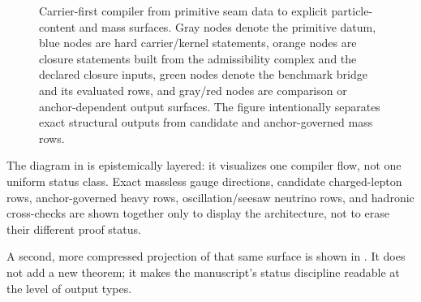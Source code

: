 \begin{figure}[p]
\caption{Carrier-first compiler from primitive seam data to explicit particle-content and mass surfaces. Gray nodes denote the primitive datum, blue nodes are hard carrier/kernel statements, orange nodes are closure statements built from the admissibility complex and the declared closure inputs, green nodes denote the benchmark bridge and its evaluated rows, and gray/red nodes are comparison or anchor-dependent output surfaces. The figure intentionally separates exact structural outputs from candidate and anchor-governed mass rows.}
\label{fig:compiler-to-masses}
\end{figure}

The diagram in  is epistemically layered: it visualizes one compiler flow, not one uniform status class. Exact massless gauge directions, candidate charged-lepton rows, anchor-governed heavy rows, oscillation/seesaw neutrino rows, and hadronic cross-checks are shown together only to display the architecture, not to erase their different proof status.

A second, more compressed projection of that same surface is shown in . It does not add a new theorem; it makes the manuscript's status discipline readable at the level of output types.


